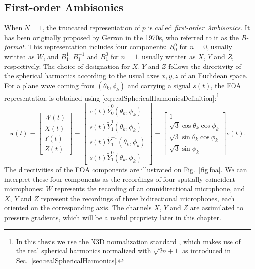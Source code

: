 \subsection{First-order Ambisonics}

When $N=1$, the truncated representation of $p$ is called \textit{first-order Ambisonics}. It has been originally proposed by Gerzon \cite{gerzon_periphony_1973} in the 1970s, who referred to it as the \textit{B-format}. This representation includes four components: $B_0^0$ for $n=0$, usually written as $W$, and $B_1^1$, $B_1^{-1}$ and $B_1^0$ for $n=1$, usually written as $X$, $Y$ and $Z$, respectively. The choice of designation for $X$, $Y$ and $Z$ follows the directivity of the spherical harmonics according to the usual axes $x,y,z$ of an Euclidean space. For a plane wave coming from $(\theta_k,\phi_k)$ and carrying a signal $s(t)$, the FOA representation is obtained using \eqref{eq:realSphericalHarmonicsDefinition}:\footnote{In this thesis we use the N3D normalization standard \cite{daniel_representation_2001}, which makes use of the real spherical harmonics normalized with $\sqrt{2n+1}$ as introduced in Sec.~\ref{sec:realSphericalHarmonics}.}
\begin{equation}\label{eqPlaneWave}
\mathbf{x}(t) = 
\begin{bmatrix} W(t) \\ X(t) \\ Y(t) \\ Z(t) \end{bmatrix}
= \begin{bmatrix} s(t) \tilde{Y}_0^0(\theta_k,\phi_k) \\ s(t) \tilde{Y}_1^1(\theta_k,\phi_k) \\ s(t) \tilde{Y}_1^{-1}(\theta_k,\phi_k) \\ s(t) \tilde{Y}_1^0(\theta_k,\phi_k) \end{bmatrix}
= \begin{bmatrix} 1 \\ \sqrt{3} \cos \theta_k \cos \phi_k \\ \sqrt{3} \sin \theta_k \cos \phi_k \\ \sqrt{3} \sin \phi_k \end{bmatrix} s(t).
\end{equation}
The directivities of the FOA components are illustrated on Fig.~\ref{fig:foa}. We can interpret these four components as the recordings of four spatially coincident microphones: $W$ represents the recording of an omnidirectional microphone, and $X$, $Y$ and $Z$ represent the recordings of three bidirectional microphones, each oriented on the corresponding axis. The channels $X$, $Y$ and $Z$ are assimilated to pressure gradients, which will be a useful propriety later in this chapter.

